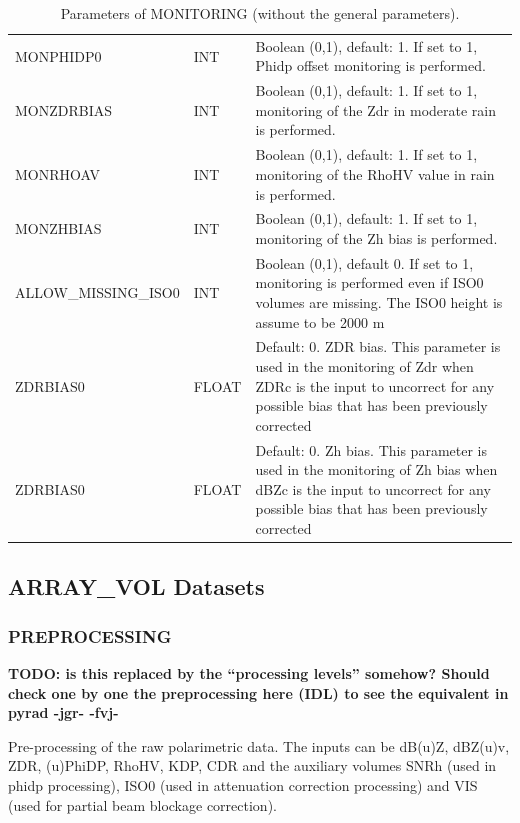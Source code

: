 \documentclass[a4paper,11pt,pdftex,twoside]{scrartcl}
\renewcommand{\bf}{\normalfont \bfseries}
\begin{document}
{{{\begin{table}[H]
\begin{tabularx}{\textwidth}{llX}
MONPHIDP0 & INT & Boolean (0,1), default: 1. If set to 1, Phidp offset monitoring is performed.\\

MONZDRBIAS & INT & Boolean (0,1), default: 1. If set to 1, monitoring of the Zdr in moderate rain is performed.\\

MONRHOAV & INT & Boolean (0,1), default: 1. If set to 1, monitoring of the RhoHV value in rain is performed.\\

MONZHBIAS & INT & Boolean (0,1), default: 1. If set to 1, monitoring of the Zh bias is performed.\\

ALLOW\_MISSING\_ISO0 & INT & Boolean (0,1), default 0. If set to 1, monitoring is performed even if ISO0 volumes are missing. The ISO0 height is assume to be 2000 m\\

ZDRBIAS0 & FLOAT & Default: 0. ZDR bias. This parameter is used in the monitoring of Zdr when ZDRc is the input to uncorrect for any possible bias that has been previously corrected\\

ZDRBIAS0 & FLOAT & Default: 0. Zh bias. This parameter is used in the monitoring of Zh bias when dBZc is the input to uncorrect for any possible bias that has been previously corrected\\
\end{tabularx}
\caption{Parameters of MONITORING (without the general parameters).}
\label{tab_dataset_monitoring}
\end{table}




\subsection{ARRAY\_VOL Datasets}

\subsubsection{PREPROCESSING}
\label{subsec_preprocessing}

{\bf TODO: is this replaced by the ``processing levels'' somehow? Should check one by one the preprocessing here (IDL) to see the equivalent in pyrad -jgr- -fvj-}

Pre-processing of the raw polarimetric data. The inputs can be dB(u)Z, dBZ(u)v, ZDR, (u)PhiDP, RhoHV, KDP, CDR and the auxiliary volumes SNRh (used in phidp processing), ISO0 (used in attenuation correction processing) and VIS (used for partial beam blockage correction).


}}}
\end{document}
